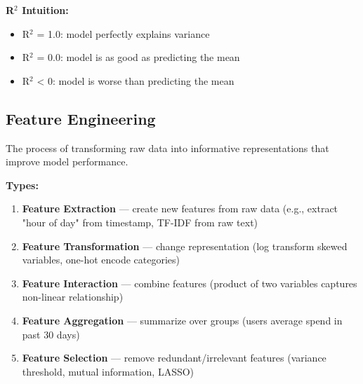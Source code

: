 \documentclass[11pt]{article}
\providecommand{\tightlist}{\setlength{\itemsep}{1pt}\setlength{\parskip}{0pt}}
\begin{document}
\textbf{R\(^2\) Intuition:}

\begin{itemize}
\tightlist
\item
  R\(^2\) = 1.0: model perfectly explains variance
\item
  R\(^2\) = 0.0: model is as good as predicting the mean
\item
  R\(^2\) \textless{} 0: model is worse than predicting the mean
\end{itemize}

\subsection{Feature Engineering}\label{feature-engineering}

The process of transforming raw data into informative representations that improve model performance.

\textbf{Types:}

\begin{enumerate}
\def\labelenumi{\arabic{enumi}.}
\tightlist
\item
  \textbf{Feature Extraction} --- create new features from raw data (e.g., extract "hour of day" from timestamp, TF-IDF from raw text)
\item
  \textbf{Feature Transformation} --- change representation (log transform skewed variables, one-hot encode categories)
\item
  \textbf{Feature Interaction} --- combine features (product of two variables captures non-linear relationship)
\item
  \textbf{Feature Aggregation} --- summarize over groups (user\textquotesingle s average spend in past 30 days)
\item
  \textbf{Feature Selection} --- remove redundant/irrelevant features (variance threshold, mutual information, LASSO)
\end{enumerate}

\end{document}
